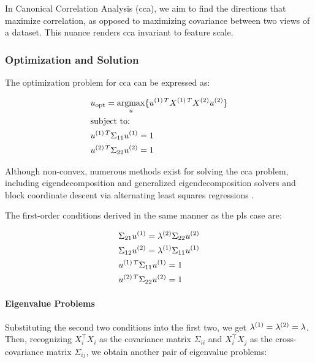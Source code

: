 In Canonical Correlation Analysis (\acrshort{cca}), we aim to find the directions that maximize correlation, as opposed to maximizing covariance between two \gls{views} of a dataset.
This nuance renders \acrshort{cca} invariant to feature scale.

\subsubsection{Optimization and Solution}
The optimization problem for \acrshort{cca} can be expressed as:

\begin{align}
    & u_{\text{opt}}=\underset{u}{\mathrm{argmax}}\{ u^{(1)\,T}X^{(1)\,T}X^{(2)}u^{(2)} \} \\
    & \text{subject to:} \notag                                                                \\
    & u^{(1)\,T}\Sigma_{11}u^{(1)}=1 \notag                                                  \\
    & u^{(2)\,T}\Sigma_{22}u^{(2)}=1 \notag
\end{align}

Although non-convex, numerous methods exist for solving the \acrshort{cca} problem, including eigendecomposition and generalized eigendecomposition solvers\citep{uurtio2017tutorial} and block coordinate descent via alternating least squares regressions \citep{golub1995canonical,sun2008least}.

The first-order conditions derived in the same manner as the \acrshort{pls} case are:

\begin{align}
    \label{CCA:FOCs}
    & \Sigma_{21}u^{(1)}=\lambda^{(2)} \Sigma_{22}u^{(2)} \\
    & \Sigma_{12}u^{(2)}=\lambda^{(1)} \Sigma_{11}u^{(1)} \\
    & u^{(1)\,T}\Sigma_{11}u^{(1)}=1                       \\
    & u^{(2)\,T}\Sigma_{22}u^{(2)}=1
\end{align}

\paragraph{Eigenvalue Problems}

Substituting the second two conditions into the first two, we get \(\lambda^{(1)}=\lambda^{(2)}=\lambda\). Then, recognizing \(X_i^{\top}X_i\) as the covariance matrix \(\Sigma_{ii}\) and \(X_i^{\top}X_j\) as the cross-covariance matrix \(\Sigma_{ij}\), we obtain another pair of eigenvalue problems:

